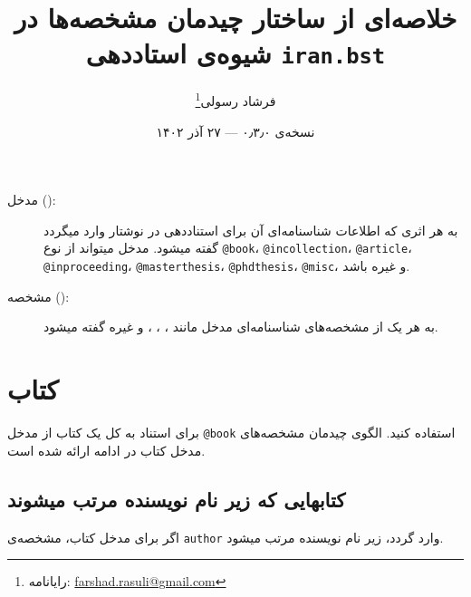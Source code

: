 \documentclass[a4paper,11pt]{article}
\begin{document}
\title{خلاصه‌ای از ساختار چیدمان مشخصه‌ها در شیوه‌ی  استاددهی {\tt iran.bst}}
\author{فرشاد رسولی\thanks{رایانامه: \url{farshad.rasuli@gmail.com}}}
\date{نسخه‌ی ۰٫۳٫۰ --- ۲۷ آذر ۱۴۰۲}
\maketitle


\begin{description}
\item[مدخل ():]
به هر اثری که اطلاعات شناسنامه‌ای آن برای استناددهی  در نوشتار وارد میگردد گفته میشود. مدخل میتواند از نوع \verb|@book|، \verb|@incollection|، \verb|@article|، \verb|@inproceeding|، \verb|@masterthesis|، \verb|@phdthesis|، \verb|@misc|، و غیره باشد.
\item[مشخصه ():]
به هر یک از مشخصه‌های شناسنامه‌ای مدخل مانند ، ، ، و غیره گفته میشود.
\end{description}



\renewcommand{\contentsname}{فهرست}
\tableofcontents










\section{کتاب}
برای استناد به کل یک کتاب از مدخل \verb|@book| استفاده کنید. الگوی چیدمان مشخصه‌های مدخل کتاب در ادامه ارائه شده است.





\subsection{کتابهایی که زیر نام نویسنده مرتب میشوند}
اگر برای مدخل کتاب، مشخصه‌ی \verb|author| وارد گردد، زیر نام نویسنده مرتب میشود.
\end{document}
